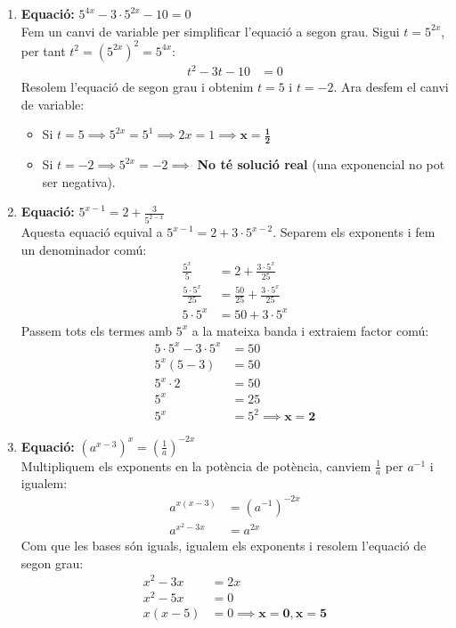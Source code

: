 \documentclass[12pt,a4paper]{article}
\begin{document}
\begin{enumerate}[label=\textbf{\alph*)}, leftmargin=*, itemsep=1cm]
    \item \textbf{Equació:} $5^{4x} - 3 \cdot 5^{2x} - 10 = 0$ \\
    Fem un canvi de variable per simplificar l'equació a segon grau. Sigui $t = 5^{2x}$, per tant $t^2 = (5^{2x})^2 = 5^{4x}$:
    \begin{align*}
        t^2 - 3t - 10 &= 0
    \end{align*}
    Resolem l'equació de segon grau i obtenim $t = 5$ i $t = -2$. Ara desfem el canvi de variable:
    \begin{itemize}
        \item Si $t = 5 \implies 5^{2x} = 5^1 \implies 2x = 1 \implies \mathbf{x = \frac{1}{2}}$
        \item Si $t = -2 \implies 5^{2x} = -2 \implies$ \textbf{No té solució real} (una exponencial no pot ser negativa).
    \end{itemize}

    \item \textbf{Equació:} $5^{x-1} = 2 + \frac{3}{5^{2-x}}$ \\
    Aquesta equació equival a $5^{x-1} = 2 + 3 \cdot 5^{x-2}$. Separem els exponents i fem un denominador comú:
    \begin{align*}
        \frac{5^x}{5} &= 2 + \frac{3 \cdot 5^x}{25} \\
        \frac{5 \cdot 5^x}{25} &= \frac{50}{25} + \frac{3 \cdot 5^x}{25} \\
        5 \cdot 5^x &= 50 + 3 \cdot 5^x
    \end{align*}
    Passem tots els termes amb $5^x$ a la mateixa banda i extraiem factor comú:
    \begin{align*}
        5 \cdot 5^x - 3 \cdot 5^x &= 50 \\
        5^x (5 - 3) &= 50 \\
        5^x \cdot 2 &= 50 \\
        5^x &= 25 \\
        5^x &= 5^2 \implies \mathbf{x = 2}
    \end{align*}

    \item \textbf{Equació:} $(a^{x-3})^x = \left(\frac{1}{a}\right)^{-2x}$ \\
    Multipliquem els exponents en la potència de potència, canviem $\frac{1}{a}$ per $a^{-1}$ i igualem:
    \begin{align*}
        a^{x(x-3)} &= (a^{-1})^{-2x} \\
        a^{x^2 - 3x} &= a^{2x}
    \end{align*}
    Com que les bases són iguals, igualem els exponents i resolem l'equació de segon grau:
    \begin{align*}
        x^2 - 3x &= 2x \\
        x^2 - 5x &= 0 \\
        x(x - 5) &= 0 \implies \mathbf{x = 0}, \mathbf{x = 5}
    \end{align*}


\end{enumerate}
\end{document}
